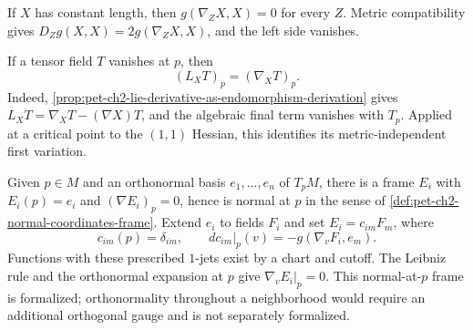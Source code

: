 \begin{remark}
  \label{rem:pet-ch2-ex-17}


  If $X$ has constant length, then
  $g(\nabla_ZX,X)=0$ for every $Z$.
  \sketch
  Metric compatibility gives
  $D_Zg(X,X)=2g(\nabla_ZX,X)$, and the left side vanishes.
\end{remark}

\begin{remark}
  \label{rem:pet-ch2-ex-18}


  If a tensor field $T$ vanishes at $p$, then
  \[
    (L_XT)_p=(\nabla_XT)_p.
  \]
  \sketch
  Indeed, \cref{prop:pet-ch2-lie-derivative-as-endomorphism-derivation} gives
  $L_XT=\nabla_XT-(\nabla X)T$, and the algebraic final term vanishes with
  $T_p$. Applied at a critical point to the $(1,1)$ Hessian, this identifies
  its metric-independent first variation.
\end{remark}

\begin{remark}
  \label{rem:pet-ch2-ex-19}


  Given $p\in M$ and an orthonormal basis
  $e_1,\dots,e_n$ of $T_pM$, there is a frame $E_i$ with
  $E_i(p)=e_i$ and $(\nabla E_i)_p=0$, hence is normal at $p$ in the sense of
  \cref{def:pet-ch2-normal-coordinates-frame}.
  \sketch
  Extend $e_i$ to fields $F_i$ and set $E_i=c_{im}F_m$, where
  \[
    c_{im}(p)=\delta_{im},\qquad
    dc_{im}|_p(v)=-g(\nabla_vF_i,e_m).
  \]
  Functions with these prescribed $1$-jets exist by a chart and cutoff. The
  Leibniz rule and the orthonormal expansion at $p$ give
  $\nabla_vE_i|_p=0$. This normal-at-$p$ frame is formalized; orthonormality
  throughout a neighborhood would require an additional orthogonal gauge and
  is not separately formalized.
\end{remark}

